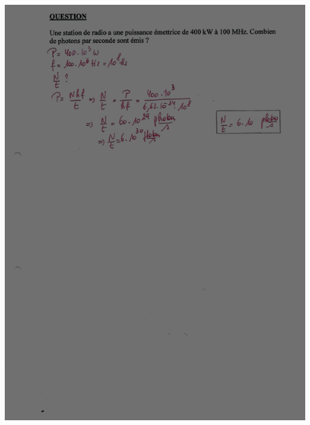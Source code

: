 {{{\includegraphics[width=17.448cm,height=24.063cm]{Pictures/10000001000002570000033B23A9DDE6A8AAA6C6.png}

}}}
